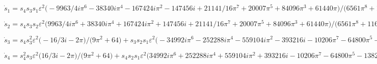 \documentclass[11pt,a5paper]{article}
\begin{document}
\begin{math}
\dot s_{1}=s_{4} s_{3} s_{1} \varepsilon ^{2} \big(-9963/4 i \pi ^{6}-
38340 i \pi ^{4}-167424 i \pi ^{2}-147456 i+21141/16 \pi ^{7}+20007 \pi 
^{5}+84096 \pi ^{3}+61440 \pi \big)/\big(6561 \pi ^{8}+116640 \pi ^{6}+
684288 \pi ^{4}+1474560 \pi ^{2}+1048576\big)+s_{3} s_{2} \varepsilon  
\big(-3 i \pi -4\big)/\big(9 \pi ^{2}+16\big)+s_{2} s_{1}^{2} 
\varepsilon ^{2} \big(-2916 i \pi ^{6}-17280 i \pi ^{4}-3072 i \pi ^{2}-
196608 i-8019/2 \pi ^{7}-44064 \pi ^{5}-93312 \pi ^{3}+122880 \pi \big)/
\big(6561 \pi ^{8}+116640 \pi ^{6}+684288 \pi ^{4}+1474560 \pi ^{2}+
1048576\big)+s_{1} \delta  \varepsilon ^{2} \big(16 i-12 \pi \big)/\big(
9 \pi ^{2}+16\big)+s_{1} \nu  \varepsilon ^{2} \big(-64 i+48 \pi \big)/
\big(9 \pi ^{2}+16\big)
\end{math}\par

\begin{math}
\dot s_{2}=s_{4} s_{3} s_{2} \varepsilon ^{2} \big(9963/4 i \pi ^{6}+
38340 i \pi ^{4}+167424 i \pi ^{2}+147456 i+21141/16 \pi ^{7}+20007 \pi 
^{5}+84096 \pi ^{3}+61440 \pi \big)/\big(6561 \pi ^{8}+116640 \pi ^{6}+
684288 \pi ^{4}+1474560 \pi ^{2}+1048576\big)+s_{4} s_{1} \varepsilon  
\big(3 i \pi -4\big)/\big(9 \pi ^{2}+16\big)+s_{2}^{2} s_{1} 
\varepsilon ^{2} \big(2916 i \pi ^{6}+17280 i \pi ^{4}+3072 i \pi ^{2}+
196608 i-8019/2 \pi ^{7}-44064 \pi ^{5}-93312 \pi ^{3}+122880 \pi \big)/
\big(6561 \pi ^{8}+116640 \pi ^{6}+684288 \pi ^{4}+1474560 \pi ^{2}+
1048576\big)+s_{2} \delta  \varepsilon ^{2} \big(-16 i-12 \pi \big)/
\big(9 \pi ^{2}+16\big)+s_{2} \nu  \varepsilon ^{2} \big(64 i+48 \pi 
\big)/\big(9 \pi ^{2}+16\big)
\end{math}\par

\begin{math}
\dot s_{3}=s_{4} s_{3}^{2} \varepsilon ^{2} \big(-16/3 i-2 \pi \big)/
\big(9 \pi ^{2}+64\big)+s_{3} s_{2} s_{1} \varepsilon ^{2} \big(-34992 i
 \pi ^{6}-252288 i \pi ^{4}-559104 i \pi ^{2}-393216 i-10206 \pi ^{7}-
64800 \pi ^{5}-138240 \pi ^{3}-98304 \pi \big)/\big(6561 \pi ^{8}+116640
 \pi ^{6}+684288 \pi ^{4}+1474560 \pi ^{2}+1048576\big)+s_{3} \delta  
\varepsilon ^{2} \big(128 i+48 \pi \big)/\big(9 \pi ^{2}+64\big)+s_{1}^{
2} \varepsilon  \big(-24 i \pi +64\big)/\big(9 \pi ^{2}+64\big)
\end{math}\par

\begin{math}
\dot s_{4}=s_{4}^{2} s_{3} \varepsilon ^{2} \big(16/3 i-2 \pi \big)/
\big(9 \pi ^{2}+64\big)+s_{4} s_{2} s_{1} \varepsilon ^{2} \big(34992 i 
\pi ^{6}+252288 i \pi ^{4}+559104 i \pi ^{2}+393216 i-10206 \pi ^{7}-
64800 \pi ^{5}-138240 \pi ^{3}-98304 \pi \big)/\big(6561 \pi ^{8}+116640
 \pi ^{6}+684288 \pi ^{4}+1474560 \pi ^{2}+1048576\big)+s_{4} \delta  
\varepsilon ^{2} \big(-128 i+48 \pi \big)/\big(9 \pi ^{2}+64\big)+s_{2}
^{2} \varepsilon  \big(24 i \pi +64\big)/\big(9 \pi ^{2}+64\big)
\end{math}
\end{document}

